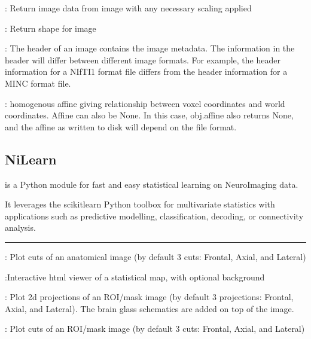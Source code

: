 \documentclass[letterpaper,10pt,english]{sphinxmanual}
\begin{document}
: Return image data from image with any necessary scaling applied

: Return shape for image

: The header of an image contains the image metadata. The information in the header will differ between different image formats. For example, the header information for a NIfTI1 format file differs from the header information for a MINC format file.

: homogenous affine giving relationship between voxel coordinates and world coordinates. Affine can also be None. In this case, obj.affine also returns None, and the affine as written to disk will depend on the file format.


\subsection{NiLearn}
\label{\detokenize{content/Glossary:nilearn}}
 is a Python module for fast and easy statistical learning on NeuroImaging data.

It leverages the scikit\sphinxhyphen{}learn Python toolbox for multivariate statistics with applications such as predictive modelling, classification, decoding, or connectivity analysis.


\bigskip\hrule\bigskip


: Plot cuts of an anatomical image (by default 3 cuts: Frontal, Axial, and Lateral)

:Interactive html viewer of a statistical map, with optional background

:  Plot 2d projections of an ROI/mask image (by default 3 projections: Frontal, Axial, and Lateral). The brain glass schematics are added on top of the image.

: Plot cuts of an ROI/mask image (by default 3 cuts: Frontal, Axial, and Lateral)
\end{document}
